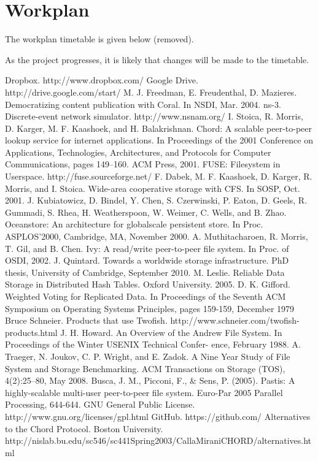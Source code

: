 \documentclass[8pt,a4paper]{article}
\begin{document}
\section{Workplan}

The workplan timetable is given below (removed).

As the project progresses, it is likely that changes will be made to the timetable.


\begin{thebibliography}{10}
Dropbox. http://www.dropbox.com/
Google Drive. http://drive.google.com/start/
M. J. Freedman, E. Freudenthal, D. Mazieres.
Democratizing content publication with Coral.
In NSDI, Mar. 2004.
ns-3. Discrete-event network simulator. http://www.nsnam.org/
I. Stoica, R. Morris, D. Karger, M. F. Kaashoek, and
H. Balakrishnan. Chord: A scalable peer-to-peer lookup
service for internet applications. In Proceedings of the 2001
Conference on Applications, Technologies, Architectures,
and Protocols for Computer Communications, pages
149–160. ACM Press, 2001.
FUSE: Filesystem in Userspace. http://fuse.sourceforge.net/ 
F. Dabek, M. F. Kaashoek, D. Karger, R. Morris, and I. Stoica. Wide-area
cooperative storage with CFS. In SOSP, Oct. 2001.
J. Kubiatowicz, D. Bindel, Y. Chen, S. Czerwinski, P. Eaton, D. Geels, R. Gummadi, S. Rhea,
H. Weatherspoon, W. Weimer, C. Wells, and B. Zhao. Oceanstore: An architecture for globalscale persistent store. In Proc. ASPLOS’2000, Cambridge, MA, November 2000.
A. Muthitacharoen, R. Morris, T. Gil, and B. Chen. 
Ivy: A read/write peer-to-peer file system. 
In Proc. of OSDI, 2002.
J. Quintard. Towards a worldwide storage infrastructure.
PhD thesis, University of Cambridge, September 2010.
M. Leslie.
Reliable Data Storage in Distributed Hash Tables. Oxford University. 2005.
D. K. Gifford. Weighted Voting for Replicated 
Data. In Proceedings of the Seventh ACM 
Symposium on Operating Systems Principles, 
pages 159-159, December 1979
Bruce Schneier. Products that use Twofish. http://www.schneier.com/twofish-products.html
J. H. Howard. An Overview of the Andrew File System.
In Proceedings of the Winter USENIX Technical Confer-
ence, February 1988.
A. Traeger, N. Joukov, C. P. Wright, and E. Zadok. A
Nine Year Study of File System and Storage Benchmarking. ACM Transactions on Storage (TOS), 4(2):25–80,
May 2008.
Busca, J. M., Picconi, F., \& Sens, P. (2005). Pastis: A highly-scalable multi-user peer-to-peer file system. Euro-Par 2005 Parallel Processing, 644-644.
GNU General Public License. http://www.gnu.org/licenses/gpl.html
GitHub. https://github.com/ 
Alternatives to the Chord Protocol. Boston University. http://nislab.bu.edu/sc546/sc441Spring2003/CallaMiraniCHORD/alternatives.html
\end{thebibliography}
\end{document}
